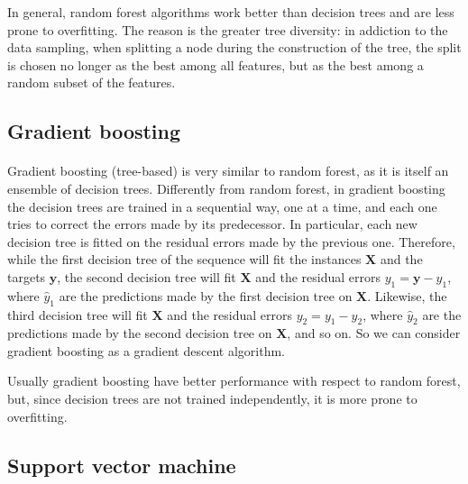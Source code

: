 In general, random forest algorithms work better than decision trees and are less prone to overfitting. The reason is the greater tree diversity: in addiction to the data sampling, when splitting a node during the construction of the tree, the split is chosen no longer as the best among all features, but as the best among a random subset of the features.

\subsection{Gradient boosting}
\paragraph{} Gradient boosting (tree-based) is very similar to random forest, as it is itself an ensemble of decision trees. Differently from random forest, in gradient boosting the decision trees are trained in a sequential way, one at a time, and each one tries to correct the errors made by its predecessor. In particular, each new decision tree is fitted on the residual errors made by the previous one. Therefore, while the first decision tree of the sequence will fit the instances $\mathbf{X}$ and the targets $\mathbf{y}$, the second decision tree will fit $\mathbf{X}$ and the residual errors $y_1 = \mathbf{y} - \hat{y}_1$, where $\hat{y}_1$ are the predictions made by the first decision tree on $\mathbf{X}$. Likewise, the third decision tree will fit $\mathbf{X}$ and the residual errors $y_2 = y_1 - \hat{y}_2$, where $\hat{y}_2$ are the predictions made by the second decision tree on $\mathbf{X}$, and so on. So we can consider gradient boosting as a gradient descent algorithm.

Usually gradient boosting have better performance with respect to random forest, but, since decision trees are not trained independently, it is more prone to overfitting.

\subsection{Support vector machine}
